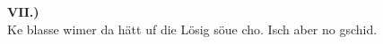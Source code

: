 \documentclass[12pt]{scrartcl}
\begin{document}
\vspace{50px}
\textbf{VII.)}\\
Ke blasse wimer da hätt uf die Lösig söue cho. Isch aber no gschid.









% 
\end{document}
